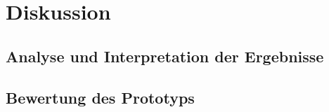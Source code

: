 \chapter{Diskussion}

\section{Analyse und Interpretation der Ergebnisse}

\section{Bewertung des Prototyps}